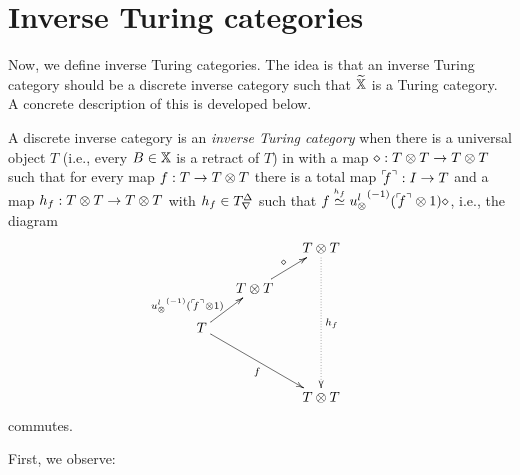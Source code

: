 \section{Inverse Turing categories}
\label{sec:inverse_turing_categories}
Now, we define inverse Turing categories. The idea is that an inverse Turing category should be a discrete
inverse category \X such that $\widetilde{\mathbb{X}}$ is a Turing category. A concrete description of this is
developed below.

\begin{definition}\label{def:inverse_turing_category}
  A discrete inverse category \X is an \emph{inverse Turing category} when there is a universal
  object $T$ (i.e., every $B\in\mathbb{X}$ is a retract of $T$) in
  \X with a map $\diamond :T\otimes T \to T\otimes T$ such that for every map $f:T \to T\otimes T$ there is a total map
  ${}^\ulcorner\!\!f^\urcorner: I\to T$ and a map $h_f:T\otimes T \to T\otimes T$ with $h_f \in {T}^{\Delta}_{\nabla}$ such that $f \overset{\scriptscriptstyle h_f}{\simeq}
  {u_{\otimes}^l}^{(-1)}({}^\ulcorner\!\!f^\urcorner\otimes1)\diamond$, i.e., the diagram
  \begin{equation}
    \xymatrix @C=15pt @R=15pt{
      & & T \* T \ar@{.>}[dddd]^{h_f}\\
      &T\*T \ar[ur]^{\diamond} & & \\
      T \ar[ur]^(.3){\inv{\usl}(\iname{f}\*1)} \ar[ddrr]_{f} \\
      & & & \\
      && T\*T
    }\label{dia:inverse-turing-category-code}
  \end{equation}
  commutes.
\end{definition}

First, we observe:

